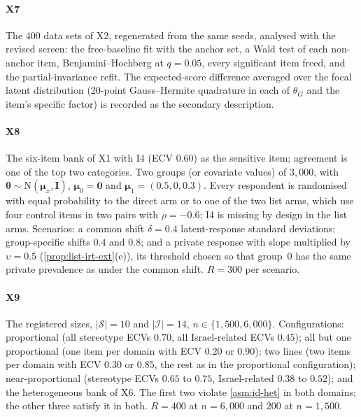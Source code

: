 \paragraph{X7}
The 400 data sets of X2, regenerated from the same seeds, analysed with the revised screen: the free-baseline fit with the anchor set, a Wald test of each non-anchor item, Benjamini--Hochberg at $q=0.05$, every significant item freed, and the partial-invariance refit. The expected-score difference averaged over the focal latent distribution (20-point Gauss--Hermite quadrature in each of $\theta_G$ and the item's specific factor) is recorded as the secondary description.

\paragraph{X8}
The six-item bank of X1 with I4 (ECV $0.60$) as the sensitive item; agreement is one of the top two categories. Two groups (or covariate values) of $3{,}000$, with $\bm\theta\sim\mathrm N(\bm\mu_x,\bm I)$, $\bm\mu_0=\bm0$ and $\bm\mu_1=(0.5,0,0.3)$. Every respondent is randomised with equal probability to the direct arm or to one of the two list arms, which use four control items in two pairs with $\rho=-0.6$; I4 is missing by design in the list arms. Scenarios: a common shift $\delta=0.4$ latent-response standard deviations; group-specific shifts $0.4$ and $0.8$; and a private response with slope multiplied by $\upsilon=0.5$ (\cref{prop:list-irt-ext}(e)), its threshold chosen so that group~0 has the same private prevalence as under the common shift. $R=300$ per scenario.

\paragraph{X9}
The registered sizes, $|\mathcal S|=10$ and $|\mathcal I|=14$, $n\in\{1{,}500,6{,}000\}$. Configurations: proportional (all stereotype ECVs $0.70$, all Israel-related ECVs $0.45$); all but one proportional (one item per domain with ECV $0.20$ or $0.90$); two lines (two items per domain with ECV $0.30$ or $0.85$, the rest as in the proportional configuration); near-proportional (stereotype ECVs $0.65$ to $0.75$, Israel-related $0.38$ to $0.52$); and the heterogeneous bank of X6. The first two violate \cref{asm:id-het} in both domains; the other three satisfy it in both. $R=400$ at $n=6{,}000$ and $200$ at $n=1{,}500$.


